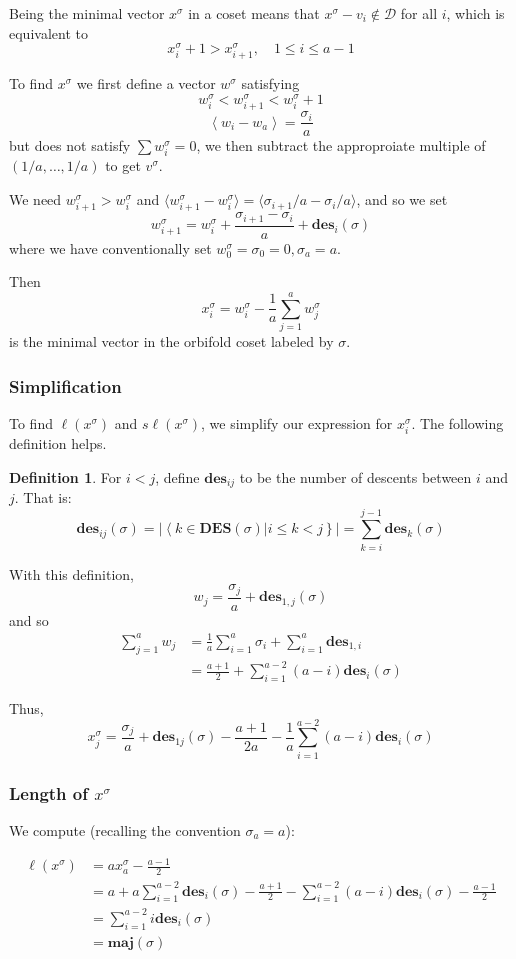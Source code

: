 \documentclass{amsart}[12pt]
\theoremstyle{definition}
\newtheorem{definition}[dummy]{Definition}
\newcommand{\sk}{s\ell}
\newcommand{\DES}{\mathbf{DES}}
\newcommand{\des}{\mathbf{des}}
\newcommand{\maj}{\mathbf{maj}}
\newcommand{\dominant}{\mathcal{D}}
\begin{document}
Being the minimal vector $x^\sigma$ in a coset means that $x^\sigma-v_i\notin\dominant$ for all $i$, which is equivalent to
$$x^\sigma_i+1>x^\sigma_{i+1},\quad 1\leq i\leq a-1$$

To find $x^\sigma$ we first define a vector $w^\sigma$ satisfying
$$w^\sigma_i<w^\sigma_{i+1}<w^\sigma_i+1$$
$$\left\langle w_i-w_a\right\rangle=\frac{\sigma_i}{a}$$
but does not satisfy $\sum w_i^\sigma=0$, we then subtract the approproiate multiple of $(1/a,\dots, 1/a)$ to get $v^\sigma$.

We need $w^\sigma_{i+1}>w^\sigma_i$ and $\langle w^\sigma_{i+1}-w^\sigma_i\rangle=\langle\sigma_{i+1}/a-\sigma_i/a\rangle$, and so we set
$$w^\sigma_{i+1}=w^\sigma_i+\frac{\sigma_{i+1}-\sigma_i}{a}+\des_i(\sigma)$$
where we have conventionally set $w^\sigma_0=\sigma_0=0, \sigma_a=a$.

Then
$$x_i^\sigma=w_i^\sigma-\frac{1}{a}\sum_{j=1}^a w^\sigma_j$$
is the minimal vector in the orbifold coset labeled by $\sigma$.
\subsubsection{Simplification}
 To find $\ell(x^\sigma)$ and $\sk(x^\sigma)$, we simplify our expression for $x_i^\sigma$.  The following definition helps.
\begin{definition}
For $i<j$, define $\des_{ij}$ to be the number of descents between $i$ and $j$.  That is:
$$\des_{ij}(\sigma)=\left|\left\langle k\in\DES(\sigma)\big| i\leq k < j\right\}\right|=\sum_{k=i}^{j-1}\des_k(\sigma)$$
\end{definition}

With this definition,
$$w_j=\frac{\sigma_j}{a}+\des_{1,j}(\sigma)$$
and so
\begin{align*}
\sum_{j=1}^a w_j &=\frac{1}{a}\sum_{i=1}^a \sigma_i +\sum_{i=1}^a \des_{1,i} \\
 &=\frac{a+1}{2}+\sum_{i=1}^{a-2} (a-i)\des_i(\sigma)
\end{align*}

Thus,
$$x^\sigma_j=\frac{\sigma_j}{a}+\des_{1j}(\sigma)-\frac{a+1}{2a}-\frac{1}{a}\sum_{i=1}^{a-2} (a-i)\des_i(\sigma)$$

\subsubsection{Length of $x^\sigma$}
We compute (recalling the convention $\sigma_a=a$):

\begin{align*}
\ell(x^\sigma) &= a x^\sigma_a-\frac{a-1}{2} \\
&=a+a\sum_{i=1}^{a-2} \des_i(\sigma)-\frac{a+1}{2}-\sum_{i=1}^{a-2} (a-i)\des_i(\sigma)-\frac{a-1}{2} \\
&=\sum_{i=1}^{a-2} i\des_i(\sigma) \\
&=\maj(\sigma)
\end{align*}
\end{document}
